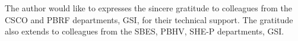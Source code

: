 The author would like to expresses the sincere gratitude to colleagues from the CSCO and PBRF departments, GSI, for their technical support. The gratitude also extends to colleagues from the SBES, PBHV, SHE-P departments, GSI. 